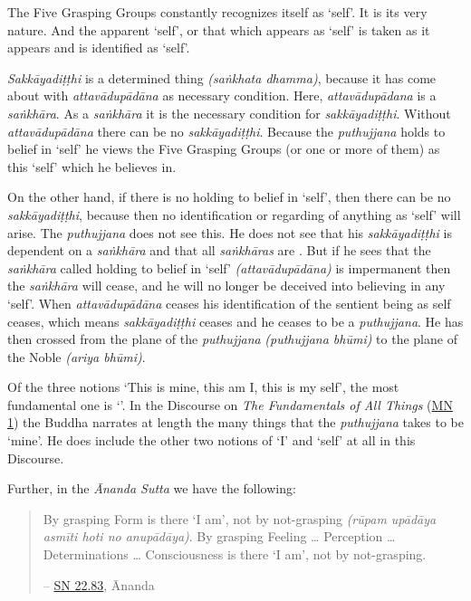 The Five Grasping Groups constantly recognizes itself as `self'. It is its very nature. And the apparent `self', or that which appears as `self' is taken as it appears and is identified as `self'.

\emph{Sakkāyadiṭṭhi} is a determined thing \emph{(saṅkhata dhamma)}, because it has come about with \emph{attavādupādāna} as necessary condition. Here, \emph{attavādupādana} is a \emph{saṅkhāra}. As a \emph{saṅkhāra} it is the necessary condition for \emph{sakkāyadiṭṭhi}. Without \emph{attavādupādāna} there can be no \emph{sakkāyadiṭṭhi}. Because the \emph{puthujjana} holds to belief in `self' he views the Five Grasping Groups (or one or more of them) as this `self' which he believes in.

On the other hand, if there is no holding to belief in `self', then there can be no \emph{sakkāyadiṭṭhi}, because then no identification or regarding of anything as `self' will arise. The \emph{puthujjana} does not see this. He does not see that his \emph{sakkāyadiṭṭhi} is dependent on a \emph{saṅkhāra} and that all \emph{saṅkhāras} are . But if he sees that the \emph{saṅkhāra} called holding to belief in `self' \emph{(attavādupādāna)} is impermanent then the \emph{saṅkhāra} will cease, and he will no longer be deceived into believing in any `self'. When \emph{attavādupādāna} ceases his identification of the sentient being as self ceases, which means \emph{sakkāyadiṭṭhi} ceases and he ceases to be a \emph{puthujjana}. He has then crossed from the plane of the \emph{puthujjana} \emph{(puthujjana bhūmi)} to the plane of the Noble \emph{(ariya bhūmi)}.

Of the three notions `This is mine, this am I, this is my self', the most fundamental one is `'. In the Discourse on \emph{The Fundamentals of All Things} (\href{https://suttacentral.net/mn1/en/bodhi}{MN 1}) the Buddha narrates at length the many things that the \emph{puthujjana} takes to be `mine'. He does  include the other two notions of `I' and `self' at all in this Discourse.

Further, in the \emph{Ānanda Sutta} we have the following:

\begin{quote}
By grasping Form is there `I am', not by not-grasping \emph{(rūpam upādāya asmīti hoti no anupādāya)}. By grasping Feeling \ldots{} Perception \ldots{} Determinations \ldots{} Consciousness is there `I am', not by not-grasping.

 -- \href{https://suttacentral.net/sn22.83/en/bodhi}{SN 22.83}, Ānanda
\end{quote}


